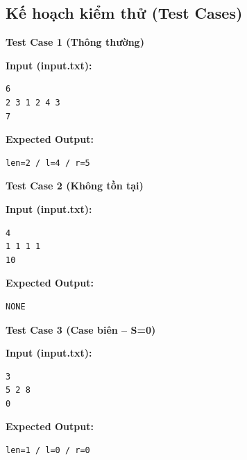 \subsection{Kế hoạch kiểm thử (Test Cases)}

\textbf{Test Case 1 (Thông thường)}

\textbf{Input (input.txt):}
\begin{lstlisting}
6
2 3 1 2 4 3
7
\end{lstlisting}

\textbf{Expected Output:}
\begin{lstlisting}
len=2 / l=4 / r=5
\end{lstlisting}

\vspace{0.5cm}

\textbf{Test Case 2 (Không tồn tại)}

\textbf{Input (input.txt):}
\begin{lstlisting}
4
1 1 1 1
10
\end{lstlisting}

\textbf{Expected Output:}
\begin{lstlisting}
NONE
\end{lstlisting}

\vspace{0.5cm}

\textbf{Test Case 3 (Case biên -- S=0)}

\textbf{Input (input.txt):}
\begin{lstlisting}
3
5 2 8
0
\end{lstlisting}

\textbf{Expected Output:}
\begin{lstlisting}
len=1 / l=0 / r=0
\end{lstlisting}